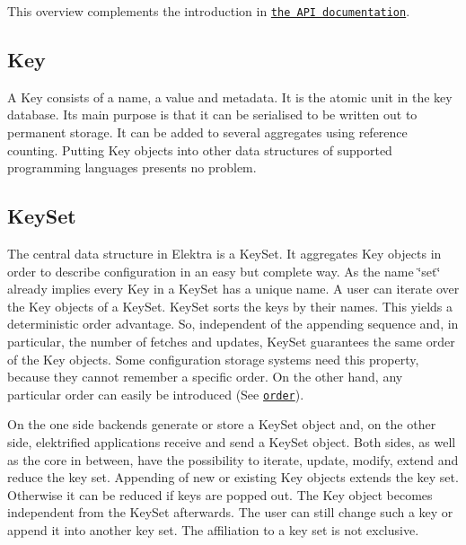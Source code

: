 This overview complements the introduction in \href{https://doc.libelektra.org/api/current/html/}{\tt the A\+PI documentation}.

\subsection*{Key}

A {\ttfamily Key} consists of a name, a value and metadata. It is the atomic unit in the key database. Its main purpose is that it can be serialised to be written out to permanent storage. It can be added to several aggregates using reference counting. Putting {\ttfamily Key} objects into other data structures of supported programming languages presents no problem.

\subsection*{Key\+Set}

The central data structure in Elektra is a {\ttfamily Key\+Set}. It aggregates {\ttfamily Key} objects in order to describe configuration in an easy but complete way. As the name \char`\"{}set\char`\"{} already implies every {\ttfamily Key} in a {\ttfamily Key\+Set} has a unique name. A user can iterate over the {\ttfamily Key} objects of a {\ttfamily Key\+Set}. {\ttfamily Key\+Set} sorts the keys by their names. This yields a deterministic order advantage. So, independent of the appending sequence and, in particular, the number of fetches and updates, {\ttfamily Key\+Set} guarantees the same order of the {\ttfamily Key} objects. Some configuration storage systems need this property, because they cannot remember a specific order. On the other hand, any particular order can easily be introduced (See \href{/home/markus/Projekte/Elektra/current/doc/METADATA.ini}{\tt order}).

On the one side backends generate or store a {\ttfamily Key\+Set} object and, on the other side, elektrified applications receive and send a {\ttfamily Key\+Set} object. Both sides, as well as the core in between, have the possibility to iterate, update, modify, extend and reduce the key set. Appending of new or existing {\ttfamily Key} objects extends the key set. Otherwise it can be reduced if keys are popped out. The {\ttfamily Key} object becomes independent from the {\ttfamily Key\+Set} afterwards. The user can still change such a key or append it into another key set. The affiliation to a key set is not exclusive.


